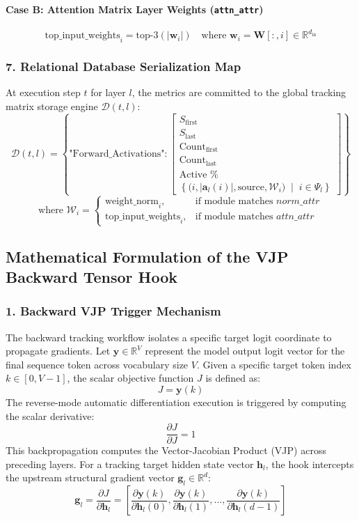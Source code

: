 \documentclass[10pt,conference]{IEEEtran}
\begin{document}
\paragraph{Case B: Attention Matrix Layer Weights (\texttt{attn\_attr})}
\[
\text{top\_input\_weights}_i = \text{top-3}\left( \left| \mathbf{w}_i \right| \right) \quad \text{where } \mathbf{w}_i = \mathbf{W}[:, i] \in \mathbb{R}^{d_{\text{in}}}
\]

\subsubsection*{7. Relational Database Serialization Map}
At execution step $t$ for layer $l$, the metrics are committed to the global tracking matrix storage engine $\mathcal{D}(t, l)$:
\[
\mathcal{D}(t, l) = \left\{ \text{"Forward\_Activations"}: \begin{bmatrix} S_{\text{first}} \\ S_{\text{last}} \\ \text{Count}_{\text{first}} \\ \text{Count}_{\text{last}} \\ \text{Active \%} \\ \left\{ \big(i, |\mathbf{a}_l(i)|, \text{source}, \mathcal{W}_i\big) \;\middle\vert{}\; i \in \Psi_l \right\} \end{bmatrix} \right\}
\]
\[
\text{where } \mathcal{W}_i = \begin{cases} \text{weight\_norm}_i, & \text{if module matches } \textit{norm\_attr} \\ \text{top\_input\_weights}_i, & \text{if module matches } \textit{attn\_attr} \end{cases}
\]

\subsection{Mathematical Formulation of the VJP Backward Tensor Hook}
\subsubsection*{1. Backward VJP Trigger Mechanism}
The backward tracking workflow isolates a specific target logit coordinate to propagate gradients. Let $\mathbf{y} \in \mathbb{R}^V$ represent the model output logit vector for the final sequence token across vocabulary size $V$. Given a specific target token index $k \in [0, V-1]$, the scalar objective function $J$ is defined as:
\[
J = \mathbf{y}(k)
\]
The reverse-mode automatic differentiation execution is triggered by computing the scalar derivative:
\[
\frac{\partial J}{\partial J} = 1
\]
This backpropagation computes the Vector-Jacobian Product (VJP) across preceding layers. For a tracking target hidden state vector $\mathbf{h}_l$, the hook intercepts the upstream structural gradient vector $\mathbf{g}_l \in \mathbb{R}^d$:
\[
\mathbf{g}_l = \frac{\partial J}{\partial \mathbf{h}_l} = \left[ \frac{\partial \mathbf{y}(k)}{\partial \mathbf{h}_l(0)}, \frac{\partial \mathbf{y}(k)}{\partial \mathbf{h}_l(1)}, \dots, \frac{\partial \mathbf{y}(k)}{\partial \mathbf{h}_l(d-1)} \right]
\]
\end{document}
